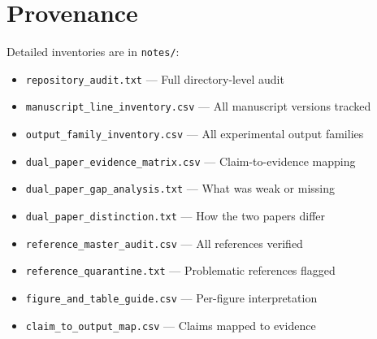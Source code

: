 \documentclass[11pt,a4paper]{article}
\begin{document}
\section{Provenance}

Detailed inventories are in \texttt{notes/}:
\begin{itemize}
\item \texttt{repository\_audit.txt} — Full directory-level audit
\item \texttt{manuscript\_line\_inventory.csv} — All manuscript versions tracked
\item \texttt{output\_family\_inventory.csv} — All experimental output families
\item \texttt{dual\_paper\_evidence\_matrix.csv} — Claim-to-evidence mapping
\item \texttt{dual\_paper\_gap\_analysis.txt} — What was weak or missing
\item \texttt{dual\_paper\_distinction.txt} — How the two papers differ
\item \texttt{reference\_master\_audit.csv} — All references verified
\item \texttt{reference\_quarantine.txt} — Problematic references flagged
\item \texttt{figure\_and\_table\_guide.csv} — Per-figure interpretation
\item \texttt{claim\_to\_output\_map.csv} — Claims mapped to evidence
\end{itemize}
\end{document}
